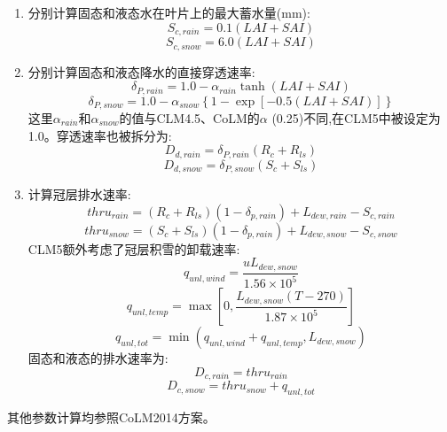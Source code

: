 \begin{enumerate}
\item 分别计算固态和液态水在叶片上的最大蓄水量(mm):
\begin{equation}
S_{c,rain}=0.1(LAI+SAI)
\end{equation}
\begin{equation}
S_{c,snow}=6.0(LAI+SAI)
\end{equation}
\item 分别计算固态和液态降水的直接穿透速率:
\begin{equation}
\delta_{P,rain}=1.0 - \alpha_{rain} \tanh(LAI+SAI)
\end{equation}
\begin{equation}
\delta_{P,snow}=1.0 - \alpha_{snow}\left\{1-\exp\left[-0.5(LAI+SAI)\right]\right\}
\end{equation}
这里$\alpha_{rain}$和$\alpha_{snow}$的值与CLM4.5、CoLM的$\alpha$ (0.25)不同,在CLM5中被设定为1.0。穿透速率也被拆分为:
\begin{equation}
D_{d,rain}=\delta_{P,rain}(R_c+R_{ls})
\end{equation}
\begin{equation}
D_{d,snow}=\delta_{P,snow}(S_c+S_{ls})
\end{equation}
\item 计算冠层排水速率:
\begin{equation}
thru_{rain}=(R_c+R_{ls})(1-\delta_{p,rain})+L_{dew,rain}-S_{c,rain}
\end{equation}
\begin{equation}
thru_{snow}=(S_c+S_{ls})(1-\delta_{p,rain})+L_{dew,snow}-S_{c,snow}
\end{equation}
CLM5额外考虑了冠层积雪的卸载速率:
\begin{equation}\label{q_unl_wind}
q_{unl,wind}=\frac{uL_{dew,snow}}{1.56\times 10^5}
\end{equation}
\begin{equation}
q_{unl,temp}=\max\left[0, \frac{L_{dew,snow}(T-270)}{1.87\times 10^5}\right]
\end{equation}
\begin{equation}\label{q_unl_tot}
q_{unl,tot}=\min(q_{unl,wind}+q_{unl,temp},L_{dew,snow})
\end{equation}
固态和液态的排水速率为:
\begin{equation}
D_{c,rain}=thru_{rain}
\end{equation}
\begin{equation}
D_{c,snow}=thru_{snow}+q_{unl,tot}
\end{equation}
\end{enumerate}
其他参数计算均参照CoLM2014方案。


